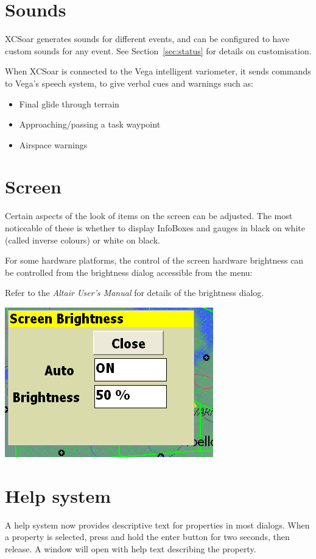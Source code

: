 \documentclass[a4paper,12pt]{refrep}
\newcommand{\InfoBox}[0]{{InfoBox}}
\begin{document}
\section{Sounds}

XCSoar generates sounds for different events, and can be configured to
have custom sounds for any event.  See Section~\ref{sec:status} for
details on customisation.

When XCSoar is connected to the Vega intelligent variometer, it sends
commands to Vega's speech system, to give verbal cues and warnings such as:
\begin{itemize}
\item Final glide through terrain
\item Approaching/passing a task waypoint
\item Airspace warnings
\end{itemize}

\section{Screen}

Certain aspects of the look of items on the screen can be adjusted.
The most noticeable of these is whether to display {\InfoBox}es and
gauges in black on white (called inverse colours) or white on black.

For some hardware platforms, the control of the screen hardware 
brightness can be controlled from the brightness dialog
accessible from the menu:
\begin{quote}
\blink{}
\end{quote}

Refer to the {\em Altair User's Manual} for details of the brightness
dialog.

\begin{center}
\includegraphics[angle=0,width=0.45\linewidth,keepaspectratio='true']{figures/brightness.png}
\end{center}

\section{Help system}
  A help system now provides descriptive text for properties in
  most dialogs.  When a property is selected, press and hold the
  enter button for two seconds, then release.  A window will open with
  help text describing the property.
\end{document}
